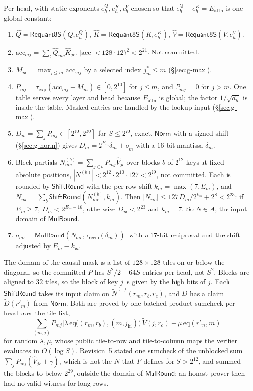 \documentclass[11pt]{article}
\begin{document}
Per head, with static exponents \(e^Q_h, e^K_h, e^V_h\) chosen so that \(e^Q_h + e^K_h = E_{\mathrm{attn}}\) is one global constant:
\begin{enumerate}
\item \(\hat Q = \mathsf{Requant8S}(Q, e^Q_h)\), \(\hat K = \mathsf{Requant8S}(K, e^K_h)\), \(\hat V = \mathsf{Requant8S}(V, e^V_h)\).
\item \(\mathrm{acc}_{mj} = \sum_{c} \hat Q_{mc} \hat K_{jc}\), \(|\mathrm{acc}| < 128 \cdot 127^2 < 2^{21}\). Not committed.
\item \(M_m = \max_{j \le m} \mathrm{acc}_{mj}\) by a selected index \(j^\ast_m \le m\) (\S\ref{sec:g-max}).
\item \(P_{mj} = \tau_{\exp}(\mathrm{acc}_{mj} - M_m) \in [0, 2^{10}]\) for \(j \le m\), and \(P_{mj} = 0\) for \(j > m\). One table serves every layer and head because \(E_{\mathrm{attn}}\) is global; the factor \(1/\sqrt{d_h}\) is inside the table. Masked entries are handled by the lookup input (\S\ref{sec:g-max}).
\item \(D_m = \sum_j P_{mj} \in [2^{10}, 2^{30}]\) for \(S \le 2^{20}\), exact. \(\mathsf{Norm}\) with a signed shift (\S\ref{sec:g-norm}) gives \(D_m = 2^{E_m}\delta_m + \rho_m\) with a \(16\)-bit mantissa \(\delta_m\).
\item Block partials \(N^{(b)}_{mc} = \sum_{j \in b} P_{mj} \hat V_{jc}\) over blocks \(b\) of \(2^{12}\) keys at fixed absolute positions, \(|N^{(b)}| < 2^{12}\cdot 2^{10}\cdot 127 < 2^{29}\), not committed.
Each is rounded by \(\mathsf{ShiftRound}\) with the per-row shift \(k_m = \max(7, E_m)\), and \(N_{mc} = \sum_b \mathsf{ShiftRound}(N^{(b)}_{mc}, k_m)\).
Then \(|N_{mc}| \le 127\, D_m / 2^{k_m} + 2^{8} < 2^{23}\): if \(E_m \ge 7\), \(D_m < 2^{E_m + 16}\); otherwise \(D_m < 2^{23}\) and \(k_m = 7\). So \(N \in A\), the input domain of \(\mathsf{MulRound}\).
\item \(o_{mc} = \mathsf{MulRound}(N_{mc}, \tau_{\mathrm{recip}}(\delta_m))\), with a \(17\)-bit reciprocal and the shift adjusted by \(E_m - k_m\).
\end{enumerate}
The domain of the causal mask is a list of \(128\times128\) tiles on or below the diagonal, so the committed \(P\) has \(S^2/2 + 64S\) entries per head, not \(S^2\).
Blocks are aligned to \(32\) tiles, so the block of key \(j\) is given by the high bits of \(j\).
Each \(\mathsf{ShiftRound}\) takes its input claim on \(\tilde N^{(\cdot)}(r_m, r_b, r_c)\), and \(D\) has a claim \(\tilde D(r'_m)\) from \(\mathsf{Norm}\).
Both are proved by one batched product sumcheck per head over the tile list,
\[
\textstyle\sum_{(m,j)} P_{mj}\big[\lambda\, \mathrm{eq}\big((r_m, r_b), (m, j_{\mathrm{hi}})\big)\, \tilde V(j, r_c) + \mu\, \mathrm{eq}(r'_m, m)\big]
\]
for random \(\lambda, \mu\), whose public tile-to-row and tile-to-column maps the verifier evaluates in \(O(\log S)\).
Revision~5 stated one sumcheck of the unblocked sum \(\sum_j P_{mj}(\hat V_{jc} + \gamma)\), which is not the \(N\) that \(F\) defines for \(S > 2^{12}\), and summed the blocks to below \(2^{29}\), outside the domain of \(\mathsf{MulRound}\); an honest prover then had no valid witness for long rows.
\end{document}
